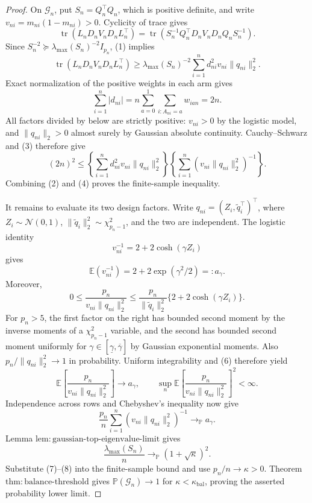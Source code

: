 \documentclass{article}
\begin{document}
\begin{proof}
On \(\mathcal G_n\), put \(S_n=Q_n^\top Q_n\), which is positive definite, and write \(v_{ni}=m_{ni}(1-m_{ni})>0\).  Cyclicity of trace gives
\[
 \operatorname{tr}(L_nD_nV_nD_nL_n^\top)
 =\operatorname{tr}\!\left(
 S_n^{-1}Q_n^\top D_nV_nD_nQ_nS_n^{-1}\right).
 \tag{1}
\]
Since \(S_n^{-2}\succeq\lambda_{\max}(S_n)^{-2}I_{p_n}\), (1) implies
\[
 \operatorname{tr}(L_nD_nV_nD_nL_n^\top)
 \ge \lambda_{\max}(S_n)^{-2}
 \sum_{i=1}^nd_{ni}^2v_{ni}\|q_{ni}\|_2^2.
 \tag{2}
\]
Exact normalization of the positive weights in each arm gives
\[
 \sum_{i=1}^n|d_{ni}|
 =n\sum_{a=0}^1\sum_{i:A_{ni}=a}w_{ian}=2n.
 \tag{3}
\]
All factors divided by below are strictly positive: \(v_{ni}>0\) by the logistic model, and \(\|q_{ni}\|_2>0\) almost surely by Gaussian absolute continuity.  Cauchy--Schwarz and (3) therefore give
\[
 (2n)^2
 \le
 \left\{\sum_{i=1}^nd_{ni}^2v_{ni}\|q_{ni}\|_2^2\right\}
 \left\{\sum_{i=1}^n(v_{ni}\|q_{ni}\|_2^2)^{-1}\right\}.
 \tag{4}
\]
Combining (2) and (4) proves the finite-sample inequality.

It remains to evaluate its two design factors.  Write \(q_{ni}=(Z_i,\widetilde q_i^\top)^\top\), where \(Z_i\sim\mathcal N(0,1)\), \(\|\widetilde q_i\|_2^2\sim\chi^2_{p_n-1}\), and the two are independent.  The logistic identity
\[
 v_{ni}^{-1}=2+2\cosh(\gamma Z_i)
 \tag{5}
\]
gives
\[
 \mathbb E(v_{ni}^{-1})=2+2\exp(\gamma^2/2)=:a_\gamma.
 \tag{6}
\]
Moreover,
\[
 0\le \frac{p_n}{v_{ni}\|q_{ni}\|_2^2}
 \le \frac{p_n}{\|\widetilde q_i\|_2^2}
       \{2+2\cosh(\gamma Z_i)\}.
\]
For \(p_n>5\), the first factor on the right has bounded second moment by the inverse moments of a \(\chi^2_{p_n-1}\) variable, and the second has bounded second moment uniformly for \(\gamma\in[\underline\gamma,\overline\gamma]\) by Gaussian exponential moments.  Also \(p_n/\|q_{ni}\|_2^2\to1\) in probability.  Uniform integrability and (6) therefore yield
\[
 \mathbb E\!\left[\frac{p_n}{v_{ni}\|q_{ni}\|_2^2}\right]\to a_\gamma,
 \qquad
 \sup_n\mathbb E\!\left[\frac{p_n}{v_{ni}\|q_{ni}\|_2^2}\right]^2<\infty.
\]
Independence across rows and Chebyshev's inequality now give
\[
 \frac{p_n}{n}\sum_{i=1}^n(v_{ni}\|q_{ni}\|_2^2)^{-1}
 \longrightarrow_{\mathbb P}a_\gamma.
 \tag{7}
\]
Lemma \(\mathrm{lem{:}gaussian\mbox{-}top\mbox{-}eigenvalue\mbox{-}limit}\) gives
\[
 \frac{\lambda_{\max}(S_n)}n
 \longrightarrow_{\mathbb P}(1+\sqrt\kappa)^2.
 \tag{8}
\]
Substitute (7)--(8) into the finite-sample bound and use \(p_n/n\to\kappa>0\).  Theorem \(\mathrm{thm{:}balance\mbox{-}threshold}\) gives \(\mathbb P(\mathcal G_n)\to1\) for \(\kappa<\kappa_{\mathrm{bal}}\), proving the asserted probability lower limit.
\end{proof}
\end{document}
